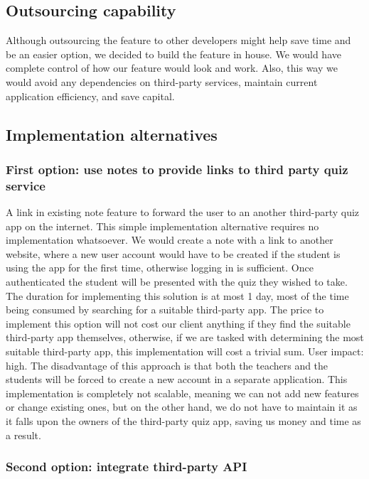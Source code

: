 \documentclass[
    english, %
]{VUMIFPSkursinis}
\begin{document}
\subsection{Outsourcing capability}

Although outsourcing the feature to other developers might help save time and be an easier option, we decided to build the feature in house. We would have complete control of how our feature would look and work. Also, this way we would avoid any dependencies on third-party services, maintain current application efficiency, and save capital.

\subsection{Implementation alternatives}

\subsubsection{First option: use notes to provide links to third party quiz service}

A link in existing note feature to forward the user to an another third-party quiz app on the internet. This simple implementation alternative requires no implementation whatsoever.  We would create a note with a link to another website, where a new user account would have to be created if the student is using the app for the first time, otherwise logging in is sufficient. Once authenticated the student will be presented with the quiz they wished to take. The duration for implementing this solution is at most 1 day, most of the time being consumed by searching for a suitable third-party app. The price to implement this option will not cost our client anything if they find the suitable third-party app themselves, otherwise, if we are tasked with determining the most suitable third-party app, this implementation will cost a trivial sum. User impact: high. The disadvantage of this approach is that both the teachers and the students will be forced to create a new account in a separate application. This implementation is completely not scalable, meaning we can not add new features or change existing ones, but on the other hand, we do not have to maintain it as it falls upon the owners of the third-party quiz app, saving us money and time as a result. 

\subsubsection{Second option: integrate third-party API}
\end{document}
